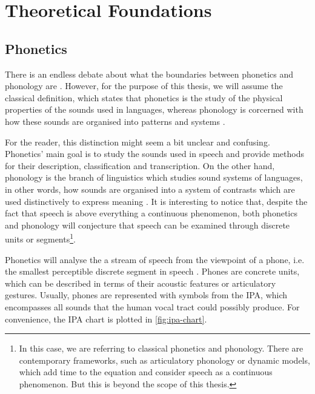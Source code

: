 \chapter{Theoretical Foundations}\label{ch:foundations}

\section{Phonetics}\label{sec:phonetics}

There is an endless debate about what the boundaries between phonetics and phonology are \cite{Steriade2000}. However, for the purpose of this thesis, we will assume the classical definition, which states that phonetics is the study of the physical properties of the sounds used in languages, whereas phonology is corcerned with how these sounds are organised into patterns and systems \cite{Davenport2010}.

For the reader, this distinction might seem a bit unclear and confusing. Phonetics' main goal is to study the sounds used in speech and provide methods for their description, classification and transcription. On the other hand, phonology is the branch of linguistics which studies sound systems of languages, in other words, how sounds are organised into a system of contrasts which are used distinctively to express meaning \cite{Crystal2011}. It is interesting to notice that, despite the fact that speech is above everything a continuous phenomenon, both phonetics and phonology will conjecture that speech can be examined through discrete units or segments\footnote{In this case, we are referring to classical phonetics and phonology. There are contemporary frameworks, such as articulatory phonology or dynamic models, which add time to the equation and consider speech as a continuous phenomenon. But this is beyond the scope of this thesis.}.

Phonetics will analyse the a stream of speech from the viewpoint of a phone, i.e. the smallest perceptible discrete segment in speech \cite{Crystal2011}. Phones are concrete units, which can be described in terms of their acoustic features or articulatory gestures. Usually, phones are represented with symbols from the \ac{IPA}, which encompasses all sounds that the human vocal tract could possibly produce. For convenience, the \ac{IPA} chart is plotted in \autoref{fig:ipa-chart}.

